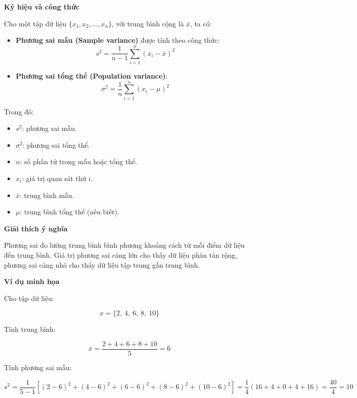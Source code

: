 \textbf{Ký hiệu và công thức}

Cho một tập dữ liệu \( \{x_1, x_2, \ldots, x_n\} \), với trung bình cộng là \( \bar{x} \), ta có:

\begin{itemize}
    \item \textbf{Phương sai mẫu (Sample variance)} được tính theo công thức:
    \begin{equation}
        s^2 = \frac{1}{n - 1} \sum_{i=1}^{n} (x_i - \bar{x})^2
        \label{eq:sample-variance}
    \end{equation}

    \item \textbf{Phương sai tổng thể (Population variance)}:
    \begin{equation}
        \sigma^2 = \frac{1}{n} \sum_{i=1}^{n} (x_i - \mu)^2
        \label{eq:population-variance}
    \end{equation}
\end{itemize}

Trong đó:
\begin{itemize}
    \item \( s^2 \): phương sai mẫu.
    \item \( \sigma^2 \): phương sai tổng thể.
    \item \( n \): số phần tử trong mẫu hoặc tổng thể.
    \item \( x_i \): giá trị quan sát thứ \( i \).
    \item \( \bar{x} \): trung bình mẫu.
    \item \( \mu \): trung bình tổng thể (nếu biết).
\end{itemize}

\textbf{Giải thích ý nghĩa}

Phương sai đo lường trung bình bình phương khoảng cách từ mỗi điểm dữ liệu đến trung bình. Giá trị phương sai càng lớn cho thấy dữ liệu phân tán rộng, phương sai càng nhỏ cho thấy dữ liệu tập trung gần trung bình.

\textbf{Ví dụ minh họa}

Cho tập dữ liệu:

\[
x = \{ 2,\ 4,\ 6,\ 8,\ 10 \}
\]

Tính trung bình:

\[
\bar{x} = \frac{2 + 4 + 6 + 8 + 10}{5} = 6
\]

Tính phương sai mẫu:

\[
s^2 = \frac{1}{5 - 1} \left[ (2 - 6)^2 + (4 - 6)^2 + (6 - 6)^2 + (8 - 6)^2 + (10 - 6)^2 \right]
= \frac{1}{4} (16 + 4 + 0 + 4 + 16) = \frac{40}{4} = 10
\]

